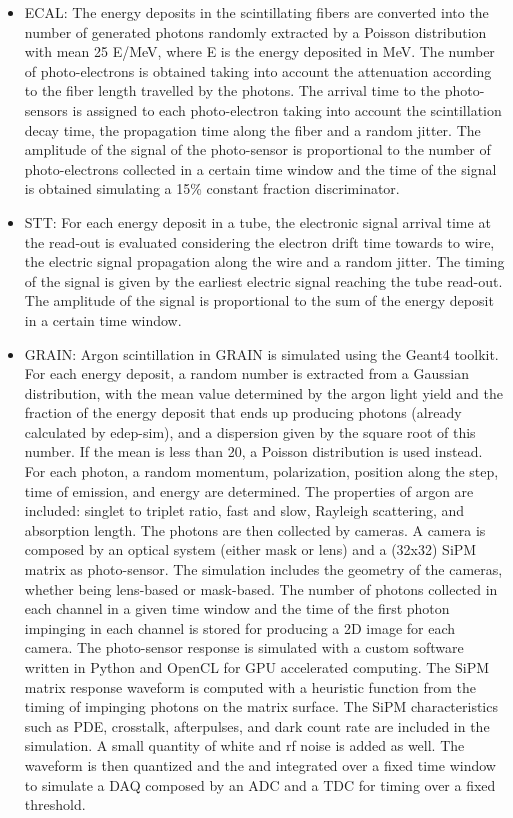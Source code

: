 \documentclass[../main-v1.tex]{subfiles}
\begin{document}
 \begin{itemize}
\item{ECAL:} The energy deposits in the scintillating fibers are converted into the number of generated photons randomly extracted by a Poisson distribution with mean 25 E/MeV, where E is the energy deposited in MeV. The number of photo-electrons is obtained taking into account the attenuation according to the fiber length travelled by the photons. The arrival time to the photo-sensors is assigned to each photo-electron taking into account the scintillation decay time, the propagation time along the fiber and a random jitter. The amplitude of the signal of the photo-sensor is proportional to the number of photo-electrons collected in a certain time window and the time of the signal is obtained simulating a 15\% constant fraction discriminator.
 
\item{STT:} For each energy deposit in a tube, the electronic signal arrival time at the read-out is evaluated considering the electron drift time towards to wire, the electric signal propagation along the wire and a random jitter. The timing of the signal is given by the earliest electric signal reaching the tube read-out. The amplitude of the signal is proportional to the sum of the energy deposit in a certain time window.
 
\item{GRAIN:} Argon scintillation in GRAIN is simulated using the Geant4 toolkit. For each energy deposit, a random number is extracted from a Gaussian distribution, with the mean value determined by the argon light yield and the fraction of the energy deposit that ends up producing photons (already calculated by edep-sim), and a dispersion given by the square root of this number. If the mean is less than 20, a Poisson distribution is used instead. For each photon, a random momentum, polarization, position along the step, time of emission, and energy are determined. The properties of argon are included: singlet to triplet ratio, fast and slow, Rayleigh scattering, and absorption length.
The photons are then collected by cameras. A camera is composed by an optical system (either mask or lens) and a (32x32) SiPM matrix as photo-sensor. The simulation includes the geometry of the cameras, whether being lens-based or mask-based. The number of photons collected in each channel in a given time window and the time of the first photon impinging in each channel is stored for producing a 2D image for each camera. 
The photo-sensor response is simulated with a custom software written in Python and OpenCL for GPU accelerated computing. The SiPM matrix response waveform is computed with a heuristic function from the timing of impinging photons on the matrix surface. The SiPM characteristics such as PDE, crosstalk, afterpulses, and dark count rate are included in the simulation. A small quantity of white and rf noise is added as well. The waveform is then quantized and the and integrated over a fixed time window to simulate a DAQ composed by an ADC and a TDC for timing over a fixed threshold.
\end{itemize}
\end{document}
